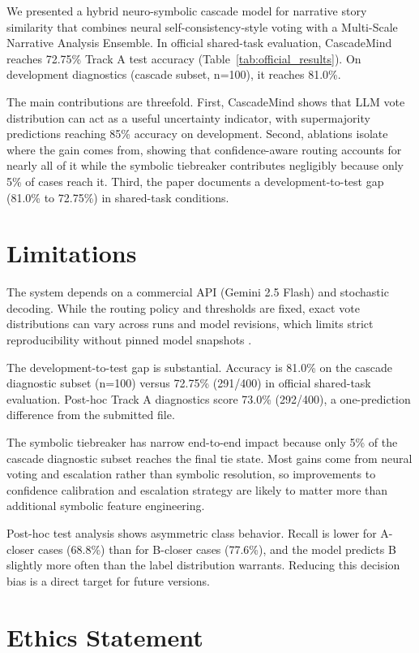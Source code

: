 \documentclass[11pt]{article}
\begin{document}
We presented a hybrid neuro-symbolic cascade model for narrative story similarity that combines neural self-consistency-style voting with a Multi-Scale Narrative Analysis Ensemble. In official shared-task evaluation, CascadeMind reaches 72.75\% Track A test accuracy (Table~\ref{tab:official_results}). On development diagnostics (cascade subset, n=100), it reaches 81.0\%.

The main contributions are threefold. First, CascadeMind shows that LLM vote distribution can act as a useful uncertainty indicator, with supermajority predictions reaching 85\% accuracy on development. Second, ablations isolate where the gain comes from, showing that confidence-aware routing accounts for nearly all of it while the symbolic tiebreaker contributes negligibly because only 5\% of cases reach it. Third, the paper documents a development-to-test gap (81.0\% to 72.75\%) in shared-task conditions.

\section*{Limitations}

The system depends on a commercial API (Gemini 2.5 Flash) and stochastic decoding. While the routing policy and thresholds are fixed, exact vote distributions can vary across runs and model revisions, which limits strict reproducibility without pinned model snapshots \citep{pineau2021reproducibility,chen2024chatgptbehavior}.

The development-to-test gap is substantial. Accuracy is 81.0\% on the cascade diagnostic subset (n=100) versus 72.75\% (291/400) in official shared-task evaluation. Post-hoc Track A diagnostics score 73.0\% (292/400), a one-prediction difference from the submitted file.

The symbolic tiebreaker has narrow end-to-end impact because only 5\% of the cascade diagnostic subset reaches the final tie state. Most gains come from neural voting and escalation rather than symbolic resolution, so improvements to confidence calibration and escalation strategy are likely to matter more than additional symbolic feature engineering.

Post-hoc test analysis shows asymmetric class behavior. Recall is lower for A-closer cases (68.8\%) than for B-closer cases (77.6\%), and the model predicts B slightly more often than the label distribution warrants. Reducing this decision bias is a direct target for future versions.

\section*{Ethics Statement}
\end{document}

